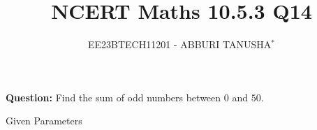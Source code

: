 \documentclass[journal,12pt,twocolumn]{IEEEtran}
\theoremstyle{remark}
\begin{document}

\vspace{3cm}
	\title{NCERT Maths 10.5.3 Q14}
	\author{EE23BTECH11201 - ABBURI TANUSHA$^{*}$%
	}
\maketitle
\newpage
\bigskip

\renewcommand{\thefigure}{\theenumi}
\renewcommand{\thetable}{\theenumi}

\vspace{3cm}
\maketitle
\textbf{Question:} 
Find the sum of odd numbers between $0$ and $50$.

\solution
\begin{table}[h!]
	\centering
	 \resizebox{6cm}{!}{
	 	
	 	}
	 	\caption{Given Parameters}
	 	\label{tab:my_label}
 \end{table}
\end{document}
